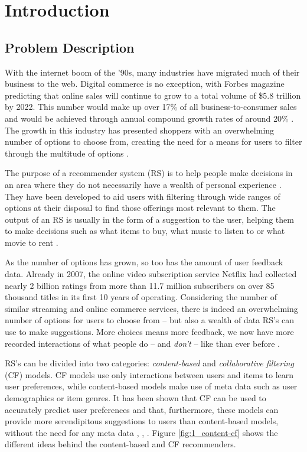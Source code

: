 \chapter{Introduction}

\label{intro} %

\section{Problem Description}
With the internet boom of the '90s, many industries have migrated much of their business to the web. Digital commerce is no exception, with Forbes magazine predicting that online sales will continue to grow to a total volume of \$5.8 trillion by 2022. This number would make up over 17\% of all business-to-consumer sales and would be achieved through annual compound growth rates of around 20\% \parencite{forbes2018growth}. The growth in this industry has presented shoppers with an overwhelming number of options to choose from, creating the need for a means for users to filter through the multitude of options \parencite{handbook_1.1_intro}.

The purpose of a recommender system (RS) is to help people make decisions in an area where they do not necessarily have a wealth of personal experience \parencite{rs_1.1_Resnick}. They have been developed to aid users with filtering through wide ranges of options at their disposal to find those offerings most relevant to them. The output of an RS is usually in the form of a suggestion to the user, helping them to make decisions such as what items to buy, what music to listen to or what movie to rent \parencite{handbook_1.1_intro}.

As the number of options has grown, so too has the amount of user feedback data. Already in 2007, the online video subscription service Netflix had collected nearly 2 billion ratings from more than 11.7 million subscribers on over 85 thousand titles in its first 10 years of operating. Considering the number of similar streaming and online commerce services, there is indeed an overwhelming number of options for users to choose from -- but also a wealth of data RS's can use to make suggestions.
More choices means more feedback, we now have more recorded interactions of what people do -- and \textit{don't} -- like than ever before \parencite{netflix_description}.

RS's can be divided into two categories: \textit{content-based} and \textit{collaborative filtering} (CF) models. CF models use only interactions between users and items to learn user preferences, while content-based models make use of meta data such as user demographics or item genres. It has been shown that CF can be used to accurately predict user preferences and that, furthermore, these models can provide more serendipitous suggestions to users than content-based models, without the need for any meta data \parencite{handbook_1.5_cf}, \parencite{handbook_1.3_content-based}, \parencite{handbook_1.8_evaluation}. Figure \ref{fig:1_content-cf} shows the different ideas behind the content-based and CF recommenders.

